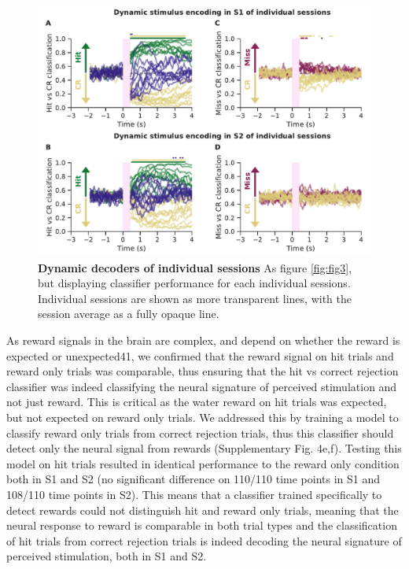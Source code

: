\begin{figure}[!h]
\hspace*{-0.2in}
\includegraphics[scale=0.76]{figures/supplements/Supplementary_Figure5.pdf}
\caption[\textbf{Dynamic decoders of individual sessions}]{\textbf{Dynamic decoders of individual sessions} As figure \ref{fig:fig3}, but displaying classifier performance for each individual sessions. Individual sessions are shown as more transparent lines, with the session average as a fully opaque line.
} 
\label{fig:supp5}
\end{figure}

As reward signals in the brain are complex, and depend on whether the reward is expected or unexpected41, we confirmed that the reward signal on hit trials and reward only trials was comparable, thus ensuring that the hit vs correct rejection classifier was indeed classifying the neural signature of perceived stimulation and not just reward. This is critical as the water reward on hit trials was expected, but not expected on reward only trials. We addressed this by training a model to classify reward only trials from correct rejection trials, thus this classifier should detect only the neural signal from rewards (Supplementary Fig. 4e,f). Testing this model on hit trials resulted in identical performance to the reward only condition both in S1 and S2 (no significant difference on 110/110 time points in S1 and 108/110 time points in S2). This means that a classifier trained specifically to detect rewards could not distinguish hit and reward only trials, meaning that the neural response to reward is comparable in both trial types and the classification of hit trials from correct rejection trials is indeed decoding the neural signature of perceived stimulation, both in S1 and S2.


